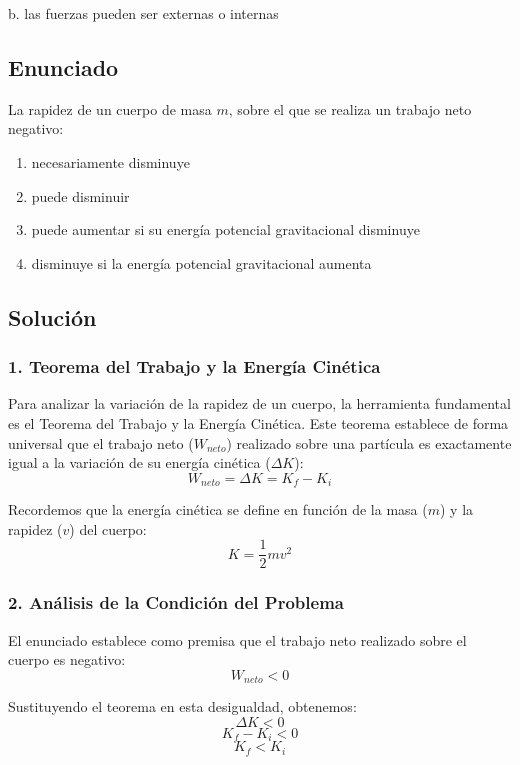 \documentclass[12pt, a4paper]{article}
\begin{document}
\begin{tcolorbox}[colback=green!5!white, colframe=green!50!black, title=Respuesta Correcta]
\centering \Large b. las fuerzas pueden ser externas o internas
\end{tcolorbox}

\newpage

\subsection*{Enunciado}
La rapidez de un cuerpo de masa $m$, sobre el que se realiza un trabajo neto negativo:
\begin{enumerate}[label=\alph*.]
    \item necesariamente disminuye
    \item puede disminuir
    \item puede aumentar si su energía potencial gravitacional disminuye
    \item disminuye si la energía potencial gravitacional aumenta
\end{enumerate}

\subsection*{Solución}

\subsubsection*{1. Teorema del Trabajo y la Energía Cinética}
Para analizar la variación de la rapidez de un cuerpo, la herramienta fundamental es el Teorema del Trabajo y la Energía Cinética. Este teorema establece de forma universal que el trabajo neto ($W_{neto}$) realizado sobre una partícula es exactamente igual a la variación de su energía cinética ($\Delta K$):
$$W_{neto} = \Delta K = K_f - K_i$$

Recordemos que la energía cinética se define en función de la masa ($m$) y la rapidez ($v$) del cuerpo:
$$K = \frac{1}{2} m v^2$$

\subsubsection*{2. Análisis de la Condición del Problema}
El enunciado establece como premisa que el trabajo neto realizado sobre el cuerpo es negativo:
$$W_{neto} < 0$$

Sustituyendo el teorema en esta desigualdad, obtenemos:
$$\Delta K < 0$$
$$K_f - K_i < 0$$
$$K_f < K_i$$
\end{document}
